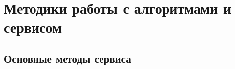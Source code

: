 \chapter{Методики работы с алгоритмами и сервисом} \label{ch:ch4}

\section{Основные методы сервиса} \label{ch:ch4/sect1}

\clearpage